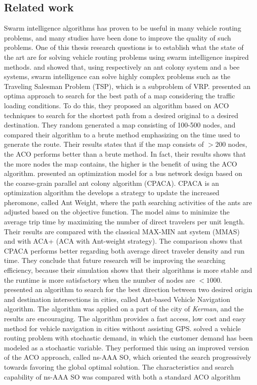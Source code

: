 \subsection{Related work}


Swarm intelligence algorithms has proven to be useful in many vehicle routing problems, and many studies have been done to improve the quality of such problems. One of this thesis research questions is to establish what the state of the art are for solving vehicle routing problems using swarm intelligence inspired methods. \citet{dorigo97} and \citet{lucic03} showed that, using respectively an ant colony system and a bee systems, swarm intelligence can solve highly complex problems such as the Traveling Salesman Problem (TSP), which is a subproblem of VRP. \citet{hsiao04} presented an optima approach to search for the best path of a map considering the traffic loading conditions. To do this, they proposed an algorithm based on ACO techniques to search for the shortest path from a desired original to a desired destination. They random generated a map consisting of 100-500 nodes, and compared their algorithm to a brute method emphasizing on the time used to generate the route. Their results states that if the map consists of $>200$ nodes, the ACO performs better than a brute method. In fact, their results shows that the more nodes the map contains, the higher is the benefit of using the ACO algorithm. \citet{yang07} presented an optimization model for a bus network design based on the coarse-grain parallel ant colony algorithm (CPACA). CPACA is an optimization algorithm the develops a strategy to update the increased pheromone, called Ant Weight, where the path searching activities of the ants are adjusted based on the objective function. The model aims to minimize the average trip time by maximizing the number of direct travelers per unit length. Their results are compared with the classical MAX-MIN ant system (MMAS)\citep{stutzle99} and with ACA+ (ACA with Ant-weight strategy). The comparison shows that CPACA performs better regarding both average direct traveler density and run time. They conclude that future research will be improving the searching efficiency, because their simulation shows that their algorithms is more stable and the runtime is more satisfactory when the number of nodes are $<1000$. \citet{salehi-nezhad07} presented an algorithm to search for the best direction between two desired origin and destination intersections in cities, called Ant-based Vehicle Navigation algorithm. The algorithm was applied on a part of the city of \textit{Kerman}, and the results are encouraging. The algorithm provides a fast access, low cost and easy method for vehicle navigation in cities without assisting GPS.\citet{tripathi09} solved a vehicle routing problem with stochastic demand, in which the customer demand has been modeled as a stochastic variable. They performed this using an improved version of the ACO approach, called ns-AAA SO, which oriented the search progressively towards favoring the global optimal solution. The characteristics and search capability of ns-AAA SO was compared with both a standard ACO algorithm 